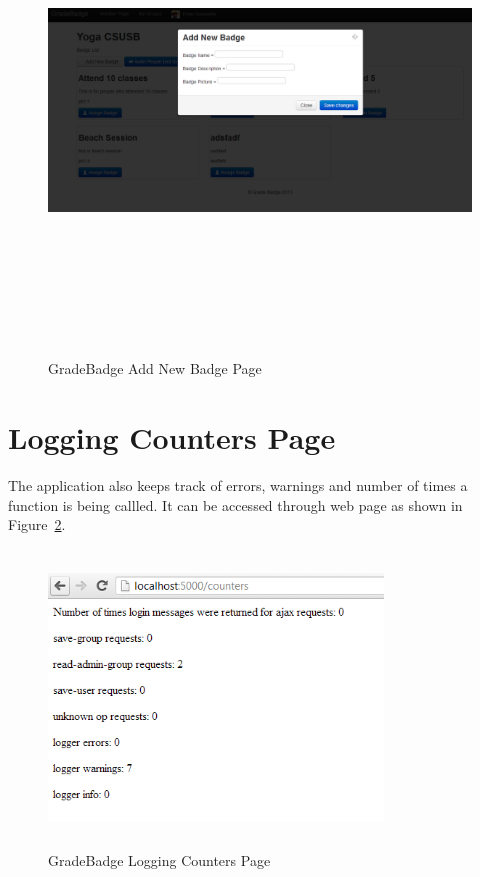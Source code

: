 \vspace{3em}
\begin{figure}[H]
\begin{center}
\includegraphics[height=5.1in,width=5.5in]{images/add-new-badge.png}
\caption{GradeBadge Add New Badge Page}
\label{fig:add-new-badge}
\end{center}
\end{figure}

\newpage
\section{Logging Counters Page}
The application also keeps track of errors, warnings and number of times a function is being callled. It can be accessed through web page as shown in Figure~\ref{fig:counters}. 

\vspace{3em}
\begin{figure}[H]
\begin{center}
\includegraphics[height=3.1in,width=3.5in]{images/counters.png}
\caption{GradeBadge Logging Counters Page}
\label{fig:counters}
\end{center}
\end{figure}

